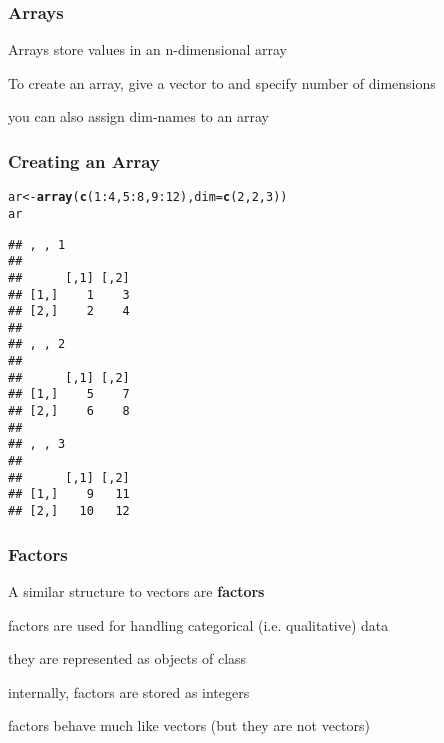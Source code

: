 \documentclass[12pt]{beamer}\usepackage[]{graphicx}\usepackage[]{color}
\makeatletter
\newcommand{\hlnum}[1]{\textcolor[rgb]{0.686,0.059,0.569}{#1}}%
\newcommand{\hlopt}[1]{\textcolor[rgb]{0,0,0}{#1}}%
\newcommand{\hlstd}[1]{\textcolor[rgb]{0.345,0.345,0.345}{#1}}%
\newcommand{\hlkwb}[1]{\textcolor[rgb]{0.69,0.353,0.396}{#1}}%
\newcommand{\hlkwc}[1]{\textcolor[rgb]{0.333,0.667,0.333}{#1}}%
\newcommand{\hlkwd}[1]{\textcolor[rgb]{0.737,0.353,0.396}{\textbf{#1}}}%
\newenvironment{kframe}{%
 \def\at@end@of@kframe{}%
 \ifinner\ifhmode%
  \def\at@end@of@kframe{\end{minipage}}%
  \begin{minipage}{\columnwidth}%
 \fi\fi%
 \def\FrameCommand##1{\hskip\@totalleftmargin \hskip-\fboxsep
 \colorbox{shadecolor}{##1}\hskip-\fboxsep
     \hskip-\linewidth \hskip-\@totalleftmargin \hskip\columnwidth}%
 \MakeFramed {\advance\hsize-\width
   \@totalleftmargin\z@ \linewidth\hsize
   \@setminipage}}%
 {\par\unskip\endMakeFramed%
 \at@end@of@kframe}
\newenvironment{knitrout}{}{} %
\makeatother
\begin{document}

\begin{frame}[fragile]
\frametitle{Arrays}

\bi
  \item Arrays store values in an n-dimensional array
  \item To create an array, give a vector to  and specify number of dimensions
  \item you can also assign dim-names to an array
\ei

\end{frame}


\begin{frame}[fragile]
\frametitle{Creating an Array}

\begin{knitrout}\scriptsize
{}\color{fgcolor}\begin{kframe}
\begin{alltt}
\hlstd{ar} \hlkwb{<-} \hlkwd{array}\hlstd{(}\hlkwd{c}\hlstd{(}\hlnum{1}\hlopt{:}\hlnum{4}\hlstd{,} \hlnum{5}\hlopt{:}\hlnum{8}\hlstd{,} \hlnum{9}\hlopt{:}\hlnum{12}\hlstd{),} \hlkwc{dim} \hlstd{=} \hlkwd{c}\hlstd{(}\hlnum{2}\hlstd{,} \hlnum{2}\hlstd{,} \hlnum{3}\hlstd{))}
\hlstd{ar}
\end{alltt}
\begin{verbatim}
## , , 1
## 
##      [,1] [,2]
## [1,]    1    3
## [2,]    2    4
## 
## , , 2
## 
##      [,1] [,2]
## [1,]    5    7
## [2,]    6    8
## 
## , , 3
## 
##      [,1] [,2]
## [1,]    9   11
## [2,]   10   12
\end{verbatim}
\end{kframe}
\end{knitrout}

\end{frame}


\begin{frame}
\begin{center}
\Huge{}
\end{center}
\end{frame}


\begin{frame}
\frametitle{Factors}

\bi 
  \item A similar structure to vectors are \textbf{factors}
  \item factors are used for handling categorical (i.e. qualitative) data
  \item they are represented as objects of class 
  \item internally, factors are stored as integers
  \item factors behave much like vectors (but they are not vectors)
\ei
\end{frame}
\end{document}
